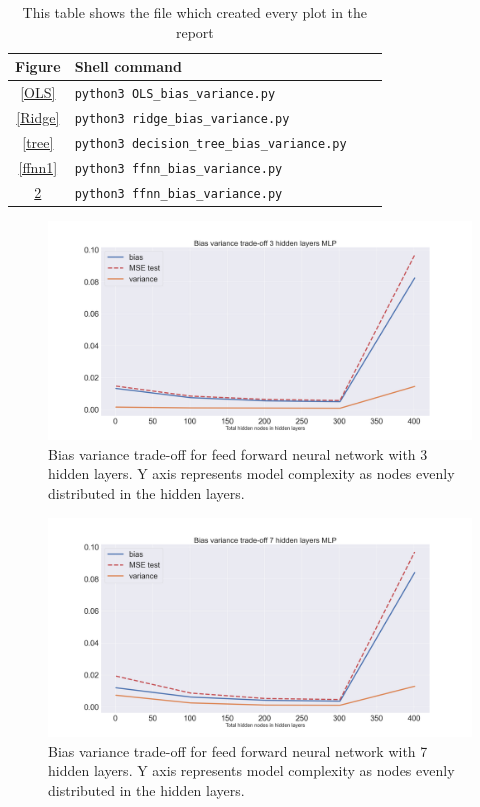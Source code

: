 \documentclass[onecolumn,10pt,cleanfoot]{asme2ej}
\begin{document}
\begin{table}[h]
\caption{This table shows the file which created every plot in the report}
\begin{center}
\label{allparamstable}
\begin{tabular}{c | l l l}
Figure & Shell command \\
\hline
\ref{OLS} & \texttt{python3 OLS\_bias\_variance.py}\\
\ref{Ridge} & \texttt{python3 ridge\_bias\_variance.py}\\
\ref{tree} & \texttt{python3 decision\_tree\_bias\_variance.py}\\
\ref{ffnn1} & \texttt{python3 ffnn\_bias\_variance.py}\\
\ref{ffnn5} & \texttt{python3 ffnn\_bias\_variance.py}\\
\hline
\end{tabular}
\end{center}
\end{table}

\begin{figure}[H]
\centerline{\includegraphics[width=5in]{figs/BV_ffnn3.png}}
\caption{Bias variance trade-off for feed forward neural network with 3 hidden layers. Y axis represents model complexity as nodes evenly distributed in the hidden layers.}
\label{ffnn5}
\end{figure}

\begin{figure}[H]
\centerline{\includegraphics[width=5in]{figs/BV_ffnn7.png}}
\caption{Bias variance trade-off for feed forward neural network with 7 hidden layers. Y axis represents model complexity as nodes evenly distributed in the hidden layers.}
\label{ffnn5}
\end{figure}
\end{document}
